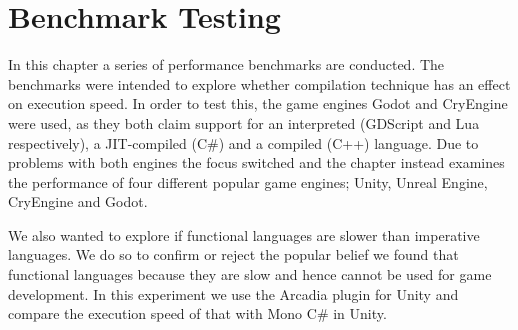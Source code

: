\chapter{Benchmark Testing} \label{chap:benchmarks}
In this chapter a series of performance benchmarks are conducted. The benchmarks were intended to explore whether compilation technique has an effect on execution speed. In order to test this, the game engines Godot and CryEngine were used, as they both claim support for an interpreted (GDScript and Lua respectively), a \ac{JIT}-compiled (C\#) and a compiled (C++) language. Due to problems with both engines the focus switched and the chapter instead examines the performance of four different popular game engines; Unity, Unreal Engine, CryEngine and Godot.

We also wanted to explore if functional languages are slower than imperative languages. We do so to confirm or reject the popular belief we found that functional languages  because they are slow \cite{pop:functional:sucks,pop:functional:slow} and hence cannot be used for game development. In this experiment we use the Arcadia plugin \cite{arcadia:github} for Unity and compare the execution speed of that with Mono C\# in Unity.





